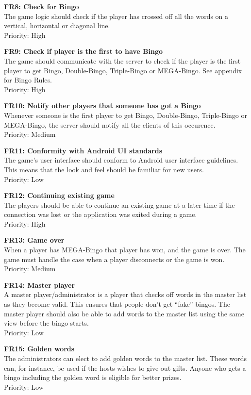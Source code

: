 {\bf FR8: Check for Bingo}\\
The game logic should check if the player has crossed off all the words on a
vertical, horizontal or diagonal line.\\
Priority: High

{\bf FR9: Check if player is the first to have Bingo}\\
The game should communicate with the server to check if the player is the first
player to get Bingo, Double-Bingo, Triple-Bingo or MEGA-Bingo. See appendix for
Bingo Rules.\\
Priority: High

{\bf FR10: Notify other players that someone has got a Bingo}\\
Whenever someone is the first player to get Bingo, Double-Bingo, Triple-Bingo
or MEGA-Bingo, the server should notify all the clients of this occurence.\\
Priority: Medium

{\bf FR11: Conformity with Android UI standards}\\
The game's user interface should conform to Android user interface guidelines.
This means that the look and feel should be familiar for new users.\\
Priority: Low

{\bf FR12: Continuing existing game}\\
The players should be able to continue an existing game at a later time if the
connection was lost or the application was exited during a game.\\
Priority: High

{\bf FR13: Game over}\\
When a player has MEGA-Bingo that player has won, and the game is over. The
game must handle the case when a player disconnects or the game is won.\\
Priority: Medium

{\bf FR14: Master player}\\
A master player/administrator is a player that checks off words in the master
list as they become valid. This ensures that people don't get ``fake'' bingos.
The master player should also be able to add words to the master list using
the same view before the bingo starts.\\
Priority: Low

{\bf FR15: Golden words}\\
The administrators can elect to add golden words to the master list. These
words can, for instance, be used if the hosts wishes to give out gifts. Anyone
who gets a bingo including the golden word is eligible for better prizes.\\
Priority: Low
